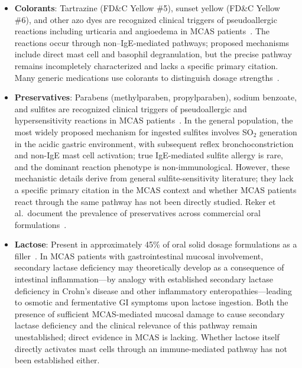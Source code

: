 \begin{itemize}
    \item \textbf{Colorants}: Tartrazine (FD\&C Yellow \#5), sunset yellow (FD\&C Yellow \#6), and other azo dyes are recognized clinical triggers of pseudoallergic reactions including urticaria and angioedema in MCAS patients~\cite{Afrin2016}. The reactions occur through non--IgE-mediated pathways; proposed mechanisms include direct mast cell and basophil degranulation, but the precise pathway remains incompletely characterized and lacks a specific primary citation. Many generic medications use colorants to distinguish dosage strengths~\cite{Reker2019excipients}.
    \item \textbf{Preservatives}: Parabens (methylparaben, propylparaben), sodium benzoate, and sulfites are recognized clinical triggers of pseudoallergic and hypersensitivity reactions in MCAS patients~\cite{Afrin2016}. In the general population, the most widely proposed mechanism for ingested sulfites involves SO$_2$ generation in the acidic gastric environment, with subsequent reflex bronchoconstriction and non-IgE mast cell activation; true IgE-mediated sulfite allergy is rare, and the dominant reaction phenotype is non-immunological. However, these mechanistic details derive from general sulfite-sensitivity literature; they lack a specific primary citation in the MCAS context and whether MCAS patients react through the same pathway has not been directly studied. Reker et al.\ document the prevalence of preservatives across commercial oral formulations~\cite{Reker2019excipients}.
    \item \textbf{Lactose}: Present in approximately 45\% of oral solid dosage formulations as a filler~\cite{Reker2019excipients}. In MCAS patients with gastrointestinal mucosal involvement, secondary lactase deficiency may theoretically develop as a consequence of intestinal inflammation---by analogy with established secondary lactase deficiency in Crohn's disease and other inflammatory enteropathies---leading to osmotic and fermentative GI symptoms upon lactose ingestion. Both the presence of sufficient MCAS-mediated mucosal damage to cause secondary lactase deficiency and the clinical relevance of this pathway remain unestablished; direct evidence in MCAS is lacking. Whether lactose itself directly activates mast cells through an immune-mediated pathway has not been established either.

\end{itemize}
